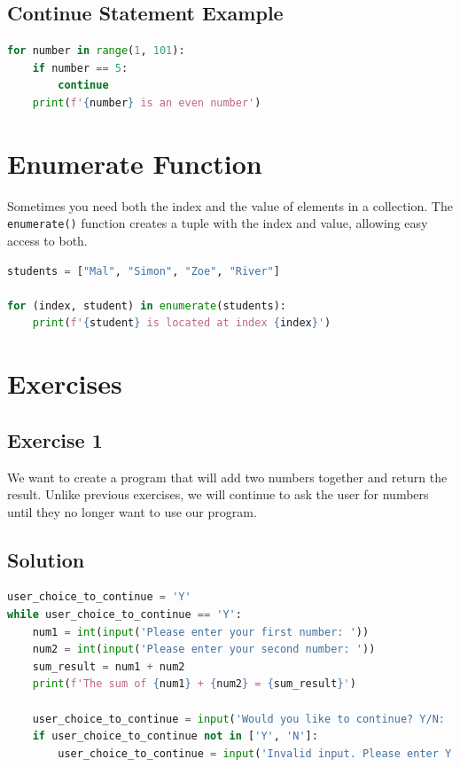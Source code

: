 \documentclass{article}
\begin{document}
 
\subsection{Continue Statement Example}

\begin{lstlisting}[language=Python]
for number in range(1, 101):
    if number == 5:
        continue
    print(f'{number} is an even number')
\end{lstlisting}

\section{Enumerate Function}
Sometimes you need both the index and the value of elements in a collection. The \texttt{enumerate()} function creates a tuple with the index and value, allowing easy access to both.

\begin{lstlisting}[language=Python]
students = ["Mal", "Simon", "Zoe", "River"]

for (index, student) in enumerate(students):
    print(f'{student} is located at index {index}')
\end{lstlisting}

\section{Exercises}

\subsection{Exercise 1}
We want to create a program that will add two numbers together and return the result. Unlike previous exercises, we will continue to ask the user for numbers until they no longer want to use our program.
\subsection*{Solution}
\begin{lstlisting}[language=Python]
user_choice_to_continue = 'Y'
while user_choice_to_continue == 'Y':
    num1 = int(input('Please enter your first number: '))
    num2 = int(input('Please enter your second number: '))
    sum_result = num1 + num2
    print(f'The sum of {num1} + {num2} = {sum_result}')
    
    user_choice_to_continue = input('Would you like to continue? Y/N: ').upper()
    if user_choice_to_continue not in ['Y', 'N']:
        user_choice_to_continue = input('Invalid input. Please enter Y or N: ')
\end{lstlisting}
\end{document}
